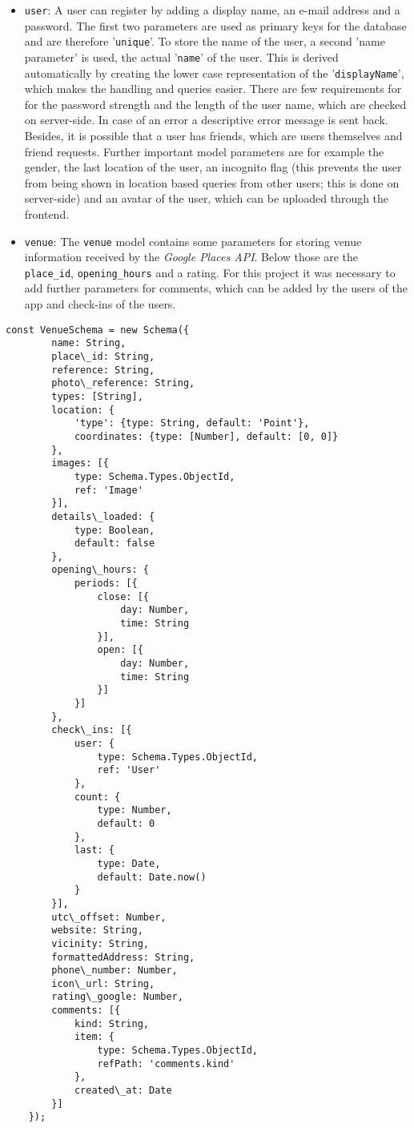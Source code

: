 \begin{itemize}
	\item \texttt{user}: A user can register by adding a display name, an e-mail address and a password. The first two parameters are used as primary keys for the database and are therefore '\texttt{unique}'. To store the name of the user, a second 'name parameter' is used, the actual '\texttt{name}' of the user. This is derived automatically by creating the lower case representation of the '\texttt{displayName}', which makes the handling and queries easier. There are few requirements for for the password strength and the length of the user name, which are checked on server-side. In case of an error a descriptive error message is sent back. \newline Besides, it is possible that a user has friends, which are users themselves and friend requests. Further important model parameters are for example the gender, the last location of the user, an incognito flag (this prevents the user from being shown in location based queries from other users; this is done on server-side) and an avatar of the user, which can be uploaded through the frontend.
	\item \texttt{venue}: The \texttt{venue} model contains some parameters for storing venue information received by the \textit{Google Places API}. Below those are the \texttt{place\_id}, \texttt{opening\_hours} and a rating. For this project it was necessary to add further parameters for comments, which can be added by the users of the app and check-ins of the users. 
\end{itemize}

\begin{lstlisting}[caption={Example of a \textit{mongoose} 'Schema'. The model for a venue is shown, which contains some properties which are fetched by the \textit{Google Places API} like the \texttt{opening\_hours} or the \texttt{place\_id}. On top, own properties like the ckeck-ins or text or image comments of users are added.}, label=lst:model]
	const VenueSchema = new Schema({
		name: String,
		place\_id: String,
		reference: String,
		photo\_reference: String,
		types: [String],
		location: {
			'type': {type: String, default: 'Point'},
			coordinates: {type: [Number], default: [0, 0]}
		},
		images: [{
			type: Schema.Types.ObjectId,
			ref: 'Image'
		}],
		details\_loaded: {
			type: Boolean,
			default: false
		},
		opening\_hours: {
			periods: [{
				close: [{
					day: Number,
					time: String
				}],
				open: [{
					day: Number,
					time: String
				}]
			}]
		},
		check\_ins: [{
			user: {
				type: Schema.Types.ObjectId,
				ref: 'User'
			},
			count: {
				type: Number,
				default: 0
			},
			last: {
				type: Date,
				default: Date.now()
			}
		}],
		utc\_offset: Number,
		website: String,
		vicinity: String,
		formattedAddress: String,
		phone\_number: Number,
		icon\_url: String,
		rating\_google: Number,
		comments: [{
			kind: String,
			item: {
				type: Schema.Types.ObjectId,
				refPath: 'comments.kind'
			},
			created\_at: Date
		}]
	});
\end{lstlisting}

